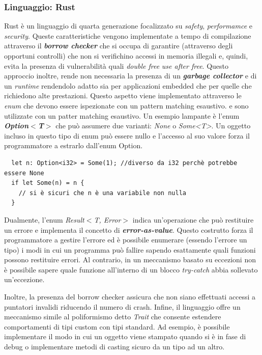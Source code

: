 \documentclass{article}
\begin{document}
\subsubsection{Linguaggio: Rust}
Rust è un linguaggio di quarta generazione focalizzato su \textit{safety}, \textit{performamce}
e \textit{security}. Queste caratteristiche vengono implementate a tempo di compilazione 
attraverso il \textbf{\textit{borrow checker}} che si occupa di garantire (attraverso degli 
opportuni controlli) che non si verifichino accessi in memoria illegali e, quindi, evita la 
presenza di vulnerabilità quali \textit{double free} \textit{use after free}. Questo approccio 
inoltre, rende non necessaria la presenza di un \textbf{\textit{garbage collector}} e di un 
\textit{runtime} rendendolo adatto sia per applicazioni embedded che per quelle che richiedono 
alte prestazioni. Questo aspetto viene implementato attraverso le \textit{enum} che devono essere ispezionate con un pattern matching esaustivo. 
e sono utilizzate con un patter matching esaustivo. Un esempio lampante è 
l'enum \textbf{\textit{Option$<$T$>$}} che può assumere due varianti: \textit{None} o \textit{Some<T>}. Un oggetto incluso in questo
tipo di enum può essere nullo e l'accesso al suo valore forza il programmatore a estrarlo
dall'enum Option. 
\begin{verbatim}
  let n: Option<i32> = Some(1); //diverso da i32 perchè potrebbe essere None
  if let Some(n) = n {
    // si è sicuri che n è una variabile non nulla
  }
\end{verbatim}
Dualmente, l'enum \textit{Result$<$T, Error$>$} indica un'operazione che può restituire 
un errore e implementa il concetto di \textbf{\textit{error-as-value}}. 
Questo costrutto forza il programmatore a gestire l'errore ed è possibile 
enumerare (essendo l'errore un tipo) i modi in cui un programma può fallire sapendo esattamente 
quali funzioni possono restituire errori. Al contrario, in un meccanismo basato su eccezioni 
non è possibile sapere quale funzione all'interno di un blocco \textit{try-catch} abbia 
sollevato un'eccezione.

Inoltre, la presenza del borrow checker assicura che non siano effettuati 
accessi a puntatori invalidi riducendo il numero di crash. Infine, il linguaggio offre un 
meccanismo simile al poliformismo detto \textit{Trait} che consente estendere comportamenti 
di tipi custom con tipi standard. Ad esempio, è possibile implementare il modo in cui un 
oggetto viene stampato quando si è in fase di debug o implementare metodi di casting sicuro 
da un tipo ad un altro.
\end{document}

